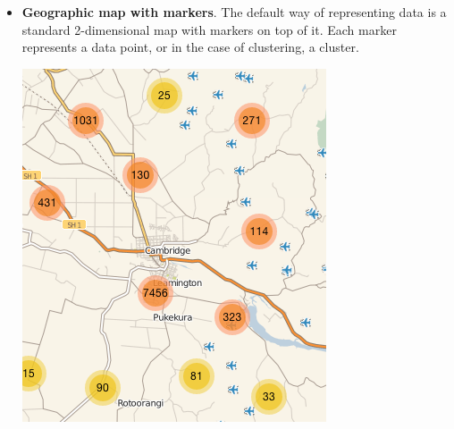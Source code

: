 \begin{itemize}

\item \textbf{Geographic map with markers}. The default way of representing data is a standard 2-dimensional map with markers on top of it. Each marker represents a data point, or in the case of clustering, a cluster.

\parbox [h]{0.4\textwidth}{
    \includegraphics [width=\linewidth]{figures/map_types_normal_leaflet.png}
    \label{fig:map-type-standard-leaflet}
}
\hfill
\hspace{0.5cm}
\parbox [h]{0.4\textwidth }{
}
\end{itemize}
